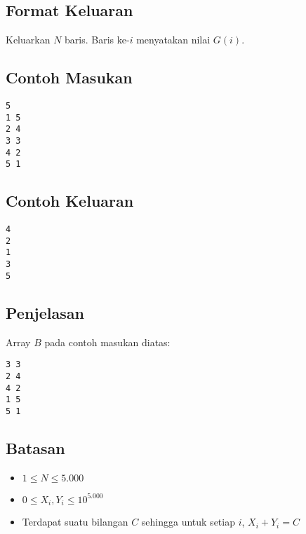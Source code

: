 \documentclass{article}
\begin{document}
\subsection*{Format Keluaran}

\par\noindent Keluarkan $N$ baris. Baris ke-$i$ menyatakan nilai $G(i)$.

\subsection*{Contoh Masukan}

\begin{lstlisting}
5
1 5
2 4
3 3
4 2
5 1
\end{lstlisting}

\subsection*{Contoh Keluaran}

\begin{lstlisting}
4
2
1
3
5
\end{lstlisting}

\subsection*{Penjelasan}

\par\noindent Array $B$ pada contoh masukan diatas:
\begin{lstlisting}
3 3
2 4
4 2
1 5
5 1
\end{lstlisting}

\subsection*{Batasan}

\begin{itemize}
	\item $1 \leq N \leq 5.000$
	\item $0 \leq X_i, Y_i \leq 10^{5.000}$
	\item Terdapat suatu bilangan $C$ sehingga untuk setiap $i$, $X_i + Y_i = C$
\end{itemize}
\end{document}
